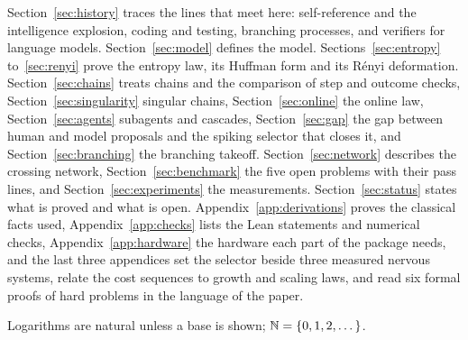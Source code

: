 Section~\ref{sec:history} traces the lines that meet here: self-reference and the intelligence explosion, coding and testing, branching processes, and verifiers for language models. Section~\ref{sec:model} defines the model. Sections~\ref{sec:entropy} to~\ref{sec:renyi} prove the entropy law, its Huffman form and its R\'enyi deformation. Section~\ref{sec:chains} treats chains and the comparison of step and outcome checks, Section~\ref{sec:singularity} singular chains, Section~\ref{sec:online} the online law, Section~\ref{sec:agents} subagents and cascades, Section~\ref{sec:gap} the gap between human and model proposals and the spiking selector that closes it, and Section~\ref{sec:branching} the branching takeoff. Section~\ref{sec:network} describes the crossing network, Section~\ref{sec:benchmark} the five open problems with their pass lines, and Section~\ref{sec:experiments} the measurements. Section~\ref{sec:status} states what is proved and what is open. Appendix~\ref{app:derivations} proves the classical facts used, Appendix~\ref{app:checks} lists the Lean statements and numerical checks, Appendix~\ref{app:hardware} the hardware each part of the package needs, and the last three appendices set the selector beside three measured nervous systems, relate the cost sequences to growth and scaling laws, and read six formal proofs of hard problems in the language of the paper.

Logarithms are natural unless a base is shown; $\mathbb{N}=\{0,1,2,\dots\}$.
